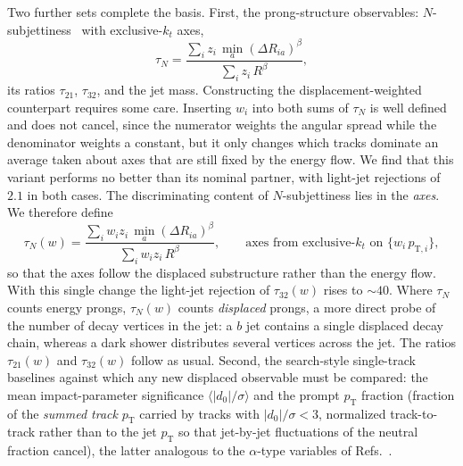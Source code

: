 \documentclass[a4paper,11pt]{article}
\newcommand{\dnought}{d_0}
\newcommand{\dR}{\Delta R}
\newcommand{\pT}{p_{\mathrm{T}}}
\begin{document}
Two further sets complete the basis. First, the prong-structure
observables: $N$-subjettiness~\cite{Thaler:2010tr} with exclusive-$k_t$
axes,
\begin{equation}
  \tau_N = \frac{\sum_i z_i \, \min_a (\dR_{ia})^\beta}
                {\sum_i z_i \, R^\beta},
\end{equation}
its ratios $\tau_{21}$, $\tau_{32}$, and the jet mass. Constructing
the displacement-weighted counterpart requires some care. Inserting
$w_i$ into both sums of $\tau_N$ is well defined and does not cancel,
since the numerator weights the angular spread while the denominator
weights a constant, but it only changes which tracks dominate an
average taken about axes that are still fixed by the energy flow. We
find that this variant performs no better than its nominal partner,
with light-jet rejections of $2.1$ in both cases. The discriminating
content of $N$-subjettiness lies in the \emph{axes}. We therefore
define
\begin{equation}
  \tau_N(w) = \frac{\sum_i w_i z_i \, \min_a (\dR_{ia})^\beta}
                    {\sum_i w_i z_i \, R^\beta},
  \qquad
  \text{axes from exclusive-$k_t$ on } \{w_i\, p_{\mathrm{T},i}\},
  \label{eq:tauw}
\end{equation}
so that the axes follow the displaced substructure rather than the
energy flow. With this single change the light-jet rejection of
$\tau_{32}(w)$ rises to $\sim 40$. Where $\tau_N$ counts energy prongs, $\tau_N(w)$ counts
\emph{displaced} prongs, a more direct probe of the number of decay
vertices in the jet: a $b$ jet contains a single displaced decay chain,
whereas a dark shower distributes several vertices across the jet. The
ratios $\tau_{21}(w)$ and $\tau_{32}(w)$ follow as usual. Second, the
search-style single-track baselines against which any new displaced
observable must be compared: the mean impact-parameter significance
$\langle |\dnought|/\sigma \rangle$ and the prompt $\pT$ fraction
(fraction of the \emph{summed track} $\pT$ carried by tracks with
$|\dnought|/\sigma < 3$, normalized track-to-track rather than to
the jet $\pT$ so that jet-by-jet fluctuations of the neutral fraction
cancel), the latter analogous to the $\alpha$-type variables of
Refs.~\cite{Schwaller:2015gea,CMS:EJ}.
\end{document}
